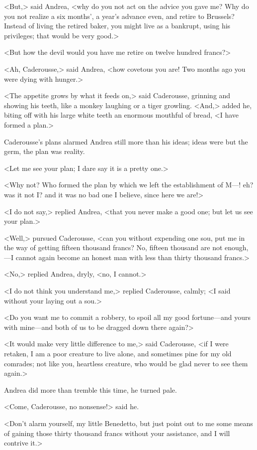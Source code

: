  <But,> said Andrea, <why do you not act on the advice you gave me? Why do you not realize a six months', a year's advance even, and retire to Brussels? Instead of living the retired baker, you might live as a bankrupt, using his privileges; that would be very good.> 

 <But how the devil would you have me retire on twelve hundred francs?> 

 <Ah, Caderousse,> said Andrea, <how covetous you are! Two months ago you were dying with hunger.> 

 <The appetite grows by what it feeds on,> said Caderousse, grinning and showing his teeth, like a monkey laughing or a tiger growling. <And,> added he, biting off with his large white teeth an enormous mouthful of bread, <I have formed a plan.> 

 Caderousse's plans alarmed Andrea still more than his ideas; ideas were but the germ, the plan was reality. 

 <Let me see your plan; I dare say it is a pretty one.> 

 <Why not? Who formed the plan by which we left the establishment of M—! eh? was it not I? and it was no bad one I believe, since here we are!> 

 <I do not say,> replied Andrea, <that you never make a good one; but let us see your plan.> 

 <Well,> pursued Caderousse, <can you without expending one sou, put me in the way of getting fifteen thousand francs? No, fifteen thousand are not enough,—I cannot again become an honest man with less than thirty thousand francs.> 

 <No,> replied Andrea, dryly, <no, I cannot.> 

 <I do not think you understand me,> replied Caderousse, calmly; <I said without your laying out a sou.> 

 <Do you want me to commit a robbery, to spoil all my good fortune—and yours with mine—and both of us to be dragged down there again?> 

 <It would make very little difference to me,> said Caderousse, <if I were retaken, I am a poor creature to live alone, and sometimes pine for my old comrades; not like you, heartless creature, who would be glad never to see them again.> 

 Andrea did more than tremble this time, he turned pale. 

 <Come, Caderousse, no nonsense!> said he. 

 <Don't alarm yourself, my little Benedetto, but just point out to me some means of gaining those thirty thousand francs without your assistance, and I will contrive it.> 

